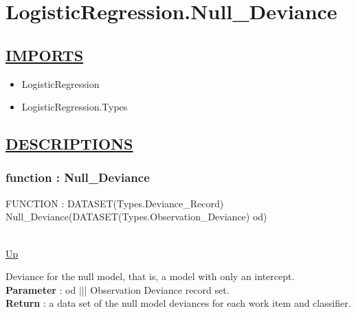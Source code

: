 \chapter*{LogisticRegression.Null\_Deviance}
\hypertarget{LogisticRegression.Null_Deviance}{}

\section*{\underline{IMPORTS}}
\begin{itemize}
\item LogisticRegression
\item LogisticRegression.Types
\end{itemize}

\section*{\underline{DESCRIPTIONS}}
\subsection*{function : Null\_Deviance}
\hypertarget{ecldoc:logisticregression.null_deviance}{FUNCTION : DATASET(Types.Deviance\_Record) Null\_Deviance(DATASET(Types.Observation\_Deviance) od)} \\
\hyperlink{ecldoc:}{Up} \\
\par
Deviance for the null model, that is, a model with only an intercept. \\
\textbf{Parameter} : od ||| Observation Deviance record set. \\
\textbf{Return} : a data set of the null model deviances for each work item and classifier. \\
